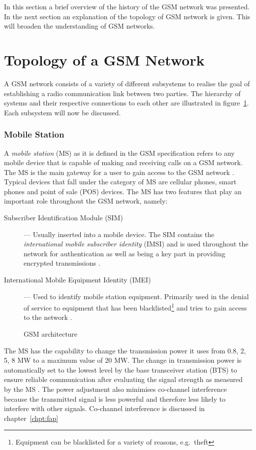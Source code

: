 In this section a brief overview of the history of the GSM network was presented. In the next section an explanation of the topology of GSM network is given. This will broaden the understanding of GSM networks.
\section{Topology of a GSM Network}
\label{sec:GSMArch}
A GSM network consists of a variety of different subsystems to realise the goal of establishing a radio communication link between two parties. The hierarchy of systems and their respective connections to each other are illustrated in figure~\ref{fig:GSMArchitecture}. Each subsystem will now be discussed.

\subsubsection{Mobile Station}
A \emph{mobile station} (MS) as it is defined in the GSM specification refers to any mobile device that is capable of making and receiving calls on a GSM network.  The MS is the main gateway 
for a user to gain access to the GSM network \cite{Eisenblatter,GSMArchitectureProtocolsServices}. Typical devices that fall under the category of MS are cellular phones, smart phones and point of sale (POS) devices. The MS has two features that play an important role throughout the GSM network, namely:
\begin{description}
\item[Subscriber Identification Module (SIM)] --- Usually inserted into a mobile device. The SIM contains the \emph{international mobile subscriber identity} (IMSI) and is used throughout the network for authentication as well as being a key part in providing encrypted transmissions \cite{Eisenblatter}.
\item[International Mobile Equipment Identity (IMEI)] --- Used to identify mobile station equipment. Primarily used in the denial of service to equipment that has been blacklisted\footnote{Equipment can be blacklisted for a variety of reasons, e.g.\ theft} and tries to gain access to the network \cite{Eisenblatter}.
\end{description}
\begin{figure}[H]
	\begin{centering}
		
		\caption{GSM architecture\cite{GSMArchitectureProtocolsServices}}
		\label{fig:GSMArchitecture}
	\end{centering}
\end{figure}
The MS has the capability to change the transmission power it uses from 0.8, 2, 5, 8 MW to a maximum value of 20 MW\cite{GSMSysEngin}. The change in transmission power is automatically set to the lowest level by the base transceiver station (BTS) to ensure reliable communication after evaluating the signal strength as measured by the MS \cite{GSMSysEngin,GSMArchitectureProtocolsServices}. The power adjustment also minimises co-channel interference because the transmitted signal is less powerful and therefore less likely to interfere with other signals\cite{GSMSysEngin}. Co-channel interference is discussed in chapter~\ref{chpt:fap}

